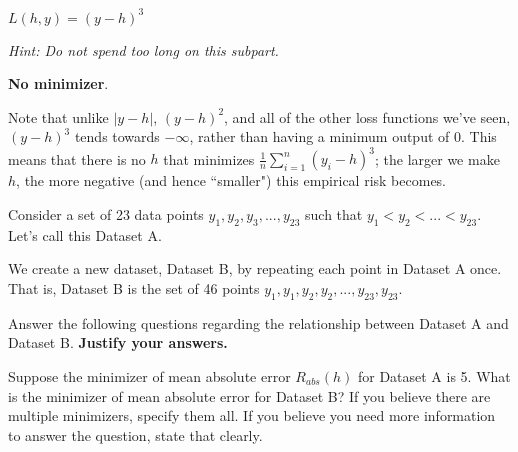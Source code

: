 \documentclass{article}
\begin{document}
\begin{probset}
\begin{prob}
\begin{subprobset}
\begin{subprob}[2.5 Points]
\begin{soln}
\end{soln}
\end{subprob}

\vspace{1in}

\begin{subprob}[1.5 Points]
$L(h, y) = (y - h)^3$

\textit{Hint: Do not spend too long on this subpart.}

\begin{soln}
\textbf{No minimizer}.

Note that unlike $|y - h|$, $(y - h)^2$, and all of the other loss functions we've seen, $(y - h)^3$ tends towards $-\infty$, rather than having a minimum output of 0. This means that there is no $h$ that minimizes $\frac{1}{n} \sum_{i = 1}^n (y_i - h)^3$; the larger we make $h$, the more negative (and hence ``smaller") this empirical risk becomes.

\end{soln}
\end{subprob}

\vspace{.75in}

\end{subprobset}

\end{prob}

\newpage

\begin{prob}

Consider a set of 23 data points $y_1, y_2, y_3, ..., y_{23}$ such that $y_1 < y_2 < ... < y_{23}$. Let's call this Dataset A.

We create a new dataset, Dataset B, by repeating each point in Dataset A once. That is, Dataset B is the set of 46 points $y_1, y_1, y_2, y_2, ..., y_{23}, y_{23}$.

Answer the following questions regarding the relationship between Dataset A and Dataset B. \textbf{Justify your answers.}

\begin{subprobset}

\begin{subprob}[3 Points]
Suppose the minimizer of mean absolute error $R_{abs}(h)$ for Dataset A is 5. What is the minimizer of mean absolute error for Dataset B? If you believe there are multiple minimizers, specify them all. If you believe you need more information to answer the question, state that clearly.


\end{subprob}
\end{subprobset}
\end{prob}
\end{probset}
\end{document}
